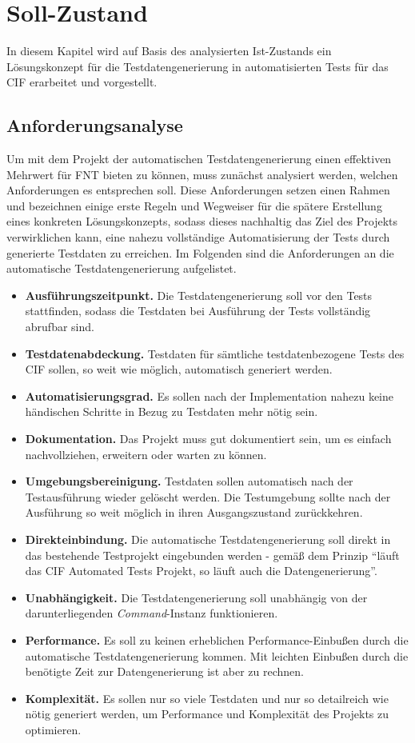 \chapter{Soll-Zustand}\label{ch:sollzustand}
In diesem Kapitel wird auf Basis des analysierten Ist-Zustands ein Lösungskonzept für die Testdatengenerierung in automatisierten Tests für das \ac{CIF} erarbeitet und vorgestellt.

\section{Anforderungsanalyse}\label{sec:anforderungen}
Um mit dem Projekt der automatischen Testdatengenerierung einen effektiven Mehrwert für FNT bieten zu können, muss zunächst analysiert werden, welchen Anforderungen es entsprechen soll. Diese Anforderungen setzen einen Rahmen und bezeichnen einige erste Regeln und Wegweiser für die spätere Erstellung eines konkreten Lösungskonzepts, sodass dieses nachhaltig das Ziel des Projekts verwirklichen kann, eine nahezu vollständige Automatisierung der Tests durch generierte Testdaten zu erreichen. Im Folgenden sind die Anforderungen an die automatische Testdatengenerierung aufgelistet.

\begin{itemize}
    \item \textbf{Ausführungszeitpunkt.} Die Testdatengenerierung soll vor den Tests stattfinden, sodass die Testdaten bei Ausführung der Tests vollständig abrufbar sind.
    \item \textbf{Testdatenabdeckung.} Testdaten für sämtliche testdatenbezogene Tests des CIF sollen, so weit wie möglich, automatisch generiert werden.
    \item \textbf{Automatisierungsgrad.} Es sollen nach der Implementation nahezu keine händischen Schritte in Bezug zu Testdaten mehr nötig sein.
    \item \textbf{Dokumentation.} Das Projekt muss gut dokumentiert sein, um es einfach nachvollziehen, erweitern oder warten zu können.
    \item \textbf{Umgebungsbereinigung.} Testdaten sollen automatisch nach der Testausführung wieder gelöscht werden. Die Testumgebung sollte nach der Ausführung so weit möglich in ihren Ausgangszustand zurückkehren.
    \item \textbf{Direkteinbindung.} Die automatische Testdatengenerierung soll direkt in das bestehende Testprojekt eingebunden werden - gemäß dem Prinzip \enquote{läuft das \ac{CIF} Automated Tests Projekt, so läuft auch die Datengenerierung}.
    \item \textbf{Unabhängigkeit.} Die Testdatengenerierung soll unabhängig von der darunterliegenden \textit{Command}-Instanz funktionieren.
    \item \textbf{Performance.} Es soll zu keinen erheblichen Performance-Einbußen durch die automatische Testdatengenerierung kommen. Mit leichten Einbußen durch die benötigte Zeit zur Datengenerierung ist aber zu rechnen.
    \item \textbf{Komplexität.} Es sollen nur so viele Testdaten und nur so detailreich wie nötig generiert werden, um Performance und Komplexität des Projekts zu optimieren.
\end{itemize}

